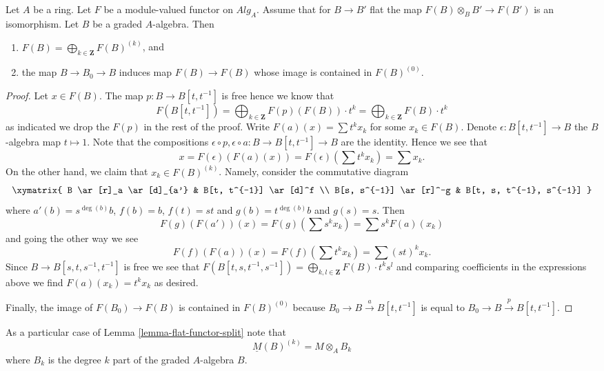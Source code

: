 \begin{lemma}
\label{lemma-flat-functor-split}
Let $A$ be a ring.
Let $F$ be a module-valued functor on $\textit{Alg}_A$.
Assume that for $B \to B'$ flat the map
$F(B) \otimes_B B' \to F(B')$ is an isomorphism.
Let $B$ be a graded $A$-algebra. Then
\begin{enumerate}
\item $F(B) = \bigoplus_{k \in \mathbf{Z}} F(B)^{(k)}$, and
\item the map $B \to B_0 \to B$ induces map $F(B) \to F(B)$
whose image is contained in $F(B)^{(0)}$.
\end{enumerate}
\end{lemma}

\begin{proof}
Let $x \in F(B)$. The map $p : B \to B[t, t^{-1}]$ is free
hence we know that
$$
F(B[t, t^{-1}]) =
\bigoplus\nolimits_{k \in \mathbf{Z}} F(p)(F(B)) \cdot t^k =
\bigoplus\nolimits_{k \in \mathbf{Z}} F(B) \cdot t^k
$$
as indicated we drop the $F(p)$ in the rest of the proof.
Write $F(a)(x) = \sum t^k x_k$ for some $x_k \in F(B)$.
Denote $\epsilon : B[t, t^{-1}] \to B$
the $B$-algebra map $t \mapsto 1$. Note that the compositions
$\epsilon \circ p, \epsilon \circ a : B \to B[t, t^{-1}] \to B$ are
the identity. Hence we see that
$$
x = F(\epsilon)(F(a)(x)) = F(\epsilon)(\sum t^k x_k) = \sum x_k.
$$
On the other hand, we claim that $x_k \in F(B)^{(k)}$. Namely, consider
the commutative diagram
$$
\xymatrix{
B \ar[r]_a \ar[d]_{a'} &
B[t, t^{-1}] \ar[d]^f \\
B[s, s^{-1}] \ar[r]^-g &
B[t, s, t^{-1}, s^{-1}]
}
$$
where $a'(b) = s^{\deg(b)}b$, $f(b) = b$, $f(t) = st$ and
$g(b) = t^{\deg(b)}b$ and $g(s) = s$. Then
$$
F(g)(F(a'))(x) = F(g)(\sum s^k x_k) =
\sum s^k F(a)(x_k)
$$
and going the other way we see
$$
F(f)(F(a))(x) = F(f)(\sum t^k x_k) = \sum (st)^k x_k.
$$
Since $B \to B[s, t, s^{-1}, t^{-1}]$ is free we see that
$F(B[t, s, t^{-1}, s^{-1}]) =
\bigoplus_{k, l \in \mathbf{Z}} F(B) \cdot t^ks^l$ and
comparing coefficients in the expressions above we find
$F(a)(x_k) = t^k x_k$ as desired.

\medskip\noindent
Finally, the image of $F(B_0) \to F(B)$ is contained in $F(B)^{(0)}$
because $B_0 \to B \xrightarrow{a} B[t, t^{-1}]$ is equal to
$B_0 \to B \xrightarrow{p} B[t, t^{-1}]$.
\end{proof}

\noindent
As a particular case of
Lemma \ref{lemma-flat-functor-split}
note that
$$
\underline{M}(B)^{(k)} = M \otimes_A B_k
$$
where $B_k$ is the degree $k$ part of the graded $A$-algebra $B$.

